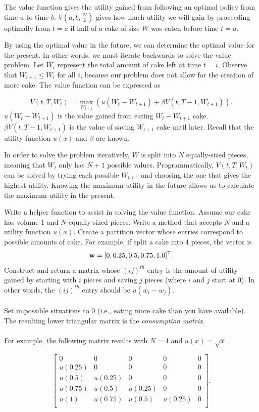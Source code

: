 The value function gives the utility gained from following an optimal policy from time $a$ to time $b$.
$V(a, b, \frac{W}{2})$ gives how much utility we will gain by proceeding optimally from $t=a$ if half of a cake of size $W$ was eaten before time $t=a$.

By using the optimal value in the future, we can determine the optimal value for the present.
In other words, we must iterate backwards to solve the value problem.
Let $W_i$ represent the total amount of cake left at time $t=i$.
Observe that $W_{i+1} \leq W_i$ for all $i$, because our problem does not allow for the creation of more cake.
The value function can be expressed as

\begin{equation}\label{equ:do1}
V(t, T, W_{t}) = \max_{W_{t+1}} \left(u(W_{t} - W_{t+1}) + \beta V(t, T-1, W_{t+1})\right).
\end{equation}
$u(W_t - W_{t+1})$ is the value gained from eating $W_t - W_{t+1}$ cake. $\beta V(t, T-1, W_{t+1})$ is the value of saving $W_{t+1}$ cake until later.
Recall that the utility function $u(x)$ and $\beta$ are known.

In order to solve the problem iteratively, $W$ is split into $N$ equally-sized pieces, meaning that $W_t$ only has $N+1$ possible values.
Programmatically, $V(t, T, W_{t})$ can be solved by trying each possible $W_{t+1}$ and choosing the one that gives the highest utility.
Knowing the maximum utility in the future allows us to calculate the maximum utility in the present.

\begin{problem}

Write a helper function to assist in solving the value function.
Assume our cake has volume $1$ and $N$ equally-sized pieces.
Write a method that accepts $N$ and a utility function $u(x)$.
Create a partition vector whose entries correspond to possible amounts of cake.
For example, if split a cake into 4 pieces, the vector is
\[
\mathbf{w} = [0, 0.25, 0.5, 0.75, 1.0]^{\mathsf T}.
\]
Construct and return a matrix whose $(ij)^{th}$ entry is the amount of utility gained by starting with $i$ pieces and saving $j$ pieces (where $i$ and $j$ start at $0$).
In other words, the $(ij)^{th}$ entry should be $u(w_i - w_j)$.
\\
\\
Set impossible situations to 0 (i.e., eating more cake than you have available).
The resulting lower triangular matrix is the \emph{consumption matrix}.
\\
\\
For example, the following matrix results with $N=4$ and $u(x) = \sqrt{x}$.

\[
\begin{bmatrix}
0 & 0 & 0 & 0 & 0 \\
u(0.25) & 0 & 0 & 0 & 0 \\
u(0.5) & u(0.25) & 0 & 0 & 0 \\
u(0.75) & u(0.5) & u(0.25) & 0 & 0 \\
u(1) & u(0.75) & u(0.5) & u(0.25) & 0 \\
\end{bmatrix}.
\]

\end{problem}


